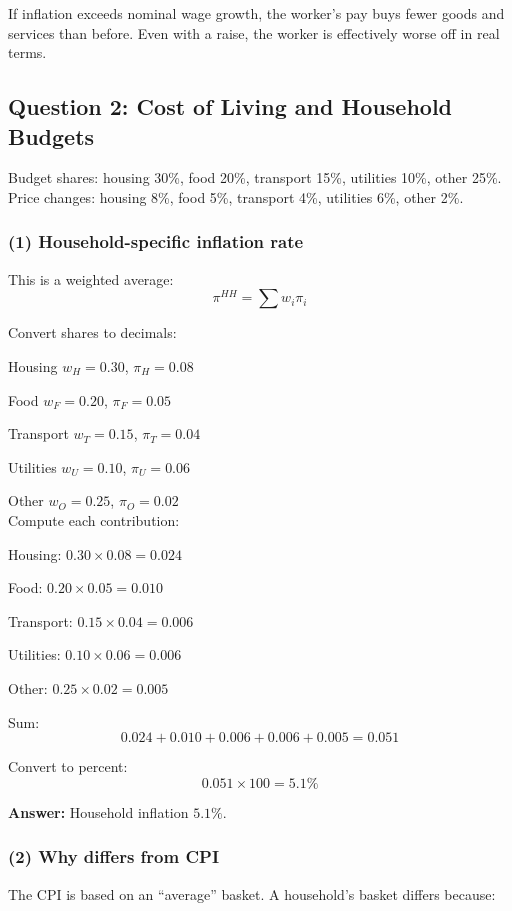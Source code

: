 \documentclass[11pt]{article}
\begin{document}
If inflation exceeds nominal wage growth, the worker’s pay buys fewer goods and services than before. Even with a raise, the worker is effectively worse off in real terms.
\newpage
\subsection*{Question 2: Cost of Living and Household Budgets}

Budget shares: housing 30\%, food 20\%, transport 15\%, utilities 10\%, other 25\%. Price changes: housing 8\%, food 5\%, transport 4\%, utilities 6\%, other 2\%.

\subsubsection*{(1) Household-specific inflation rate}

This is a weighted average:
\[
\pi^{HH}=\sum w_i\pi_i
\]

Convert shares to decimals:

Housing \(w_H=0.30\), \(\pi_H=0.08\)

Food \(w_F=0.20\), \(\pi_F=0.05\)

Transport \(w_T=0.15\), \(\pi_T=0.04\)

Utilities \(w_U=0.10\), \(\pi_U=0.06\)

Other \(w_O=0.25\), \(\pi_O=0.02\)
\vspace{0.1cm}\\

Compute each contribution:

Housing: \(0.30\times 0.08=0.024\)

Food: \(0.20\times 0.05=0.010\)

Transport: \(0.15\times 0.04=0.006\)

Utilities: \(0.10\times 0.06=0.006\)

Other: \(0.25\times 0.02=0.005\)

Sum:
\[
0.024+0.010+0.006+0.006+0.005=0.051
\]

Convert to percent:
\[
0.051\times 100=5.1\%
\]

\textbf{Answer:} Household inflation \(5.1\%\).

\subsubsection*{(2) Why differs from CPI}

The CPI is based on an “average” basket. A household’s basket differs because:
\end{document}
